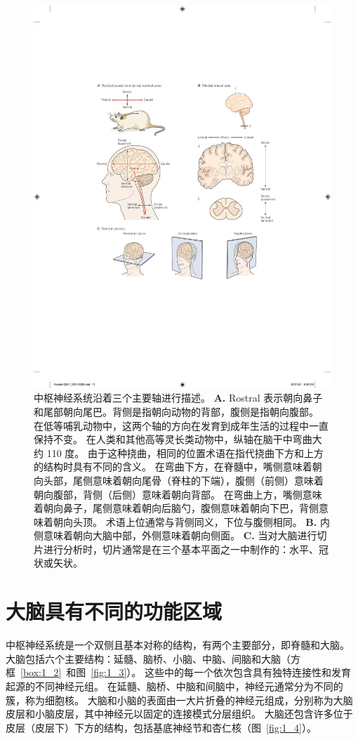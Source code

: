 \begin{figure}[htbp]
	\centering
	\includegraphics[width=0.8\linewidth]{chap01/fig_1_2}
	\caption{中枢神经系统沿着三个主要轴进行描述\cite{martin2012neuroanatomy}。 
		\textbf{A.} Rostral 表示朝向鼻子和尾部朝向尾巴。背侧是指朝向动物的背部，腹侧是指朝向腹部。
		在低等哺乳动物中，这两个轴的方向在发育到成年生活的过程中一直保持不变。
		在人类和其他高等灵长类动物中，纵轴在脑干中弯曲大约 110 度。
		由于这种挠曲，相同的位置术语在指代挠曲下方和上方的结构时具有不同的含义。
		在弯曲下方，在脊髓中，嘴侧意味着朝向头部，尾侧意味着朝向尾骨（脊柱的下端），腹侧（前侧）意味着朝向腹部，背侧（后侧）意味着朝向背部。
		在弯曲上方，嘴侧意味着朝向鼻子，尾侧意味着朝向后脑勺，腹侧意味着朝向下巴，背侧意味着朝向头顶。
		术语上位通常与背侧同义，下位与腹侧相同。
		\textbf{B.} 内侧意味着朝向大脑中部，外侧意味着朝向侧面。
		\textbf{C.} 当对大脑进行切片进行分析时，切片通常是在三个基本平面之一中制作的：水平、冠状或矢状。}
	\label{fig:1_2}
\end{figure}



\section{大脑具有不同的功能区域}

中枢神经系统是一个双侧且基本对称的结构，有两个主要部分，即脊髓和大脑。
大脑包括六个主要结构：延髓、脑桥、小脑、中脑、间脑和大脑（方框~\ref{box:1_2}~和图~\ref{fig:1_3}）。
这些中的每一个依次包含具有独特连接性和发育起源的不同神经元组。
在延髓、脑桥、中脑和间脑中，神经元通常分为不同的簇，称为细胞核。
大脑和小脑的表面由一大片折叠的神经元组成，分别称为大脑皮层和小脑皮层，其中神经元以固定的连接模式分层组织。
大脑还包含许多位于皮层（皮层下）下方的结构，包括基底神经节和杏仁核（图~\ref{fig:1_4}）。


